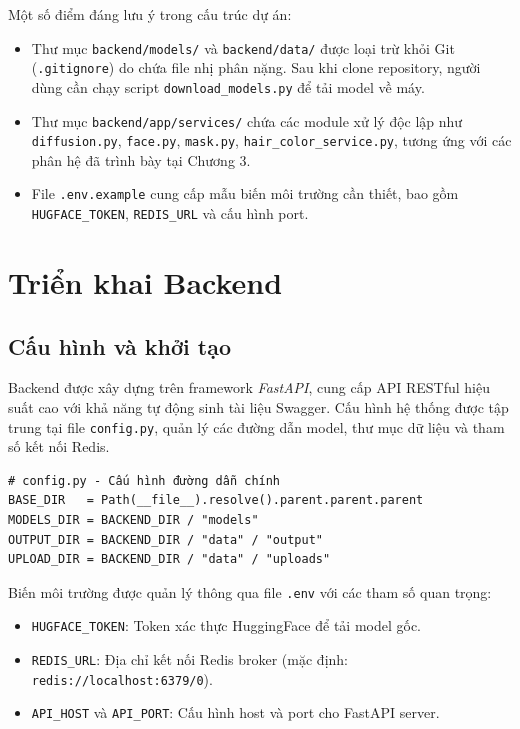 \documentclass[../main.tex]{subfiles}
\begin{document}
Một số điểm đáng lưu ý trong cấu trúc dự án:
\begin{itemize}
    \item Thư mục \texttt{backend/models/} và \texttt{backend/data/} được loại trừ khỏi Git (\texttt{.gitignore}) do chứa file nhị phân nặng. Sau khi clone repository, người dùng cần chạy script \texttt{download\_models.py} để tải model về máy.
    \item Thư mục \texttt{backend/app/services/} chứa các module xử lý độc lập như \texttt{diffusion.py}, \texttt{face.py}, \texttt{mask.py}, \texttt{hair\_color\_service.py}, tương ứng với các phân hệ đã trình bày tại Chương 3.
    \item File \texttt{.env.example} cung cấp mẫu biến môi trường cần thiết, bao gồm \texttt{HUGFACE\_TOKEN}, \texttt{REDIS\_URL} và cấu hình port.
\end{itemize}

\section{Triển khai Backend}

\subsection{Cấu hình và khởi tạo}
Backend được xây dựng trên framework \textit{FastAPI}, cung cấp API RESTful hiệu suất cao với khả năng tự động sinh tài liệu Swagger. Cấu hình hệ thống được tập trung tại file \texttt{config.py}, quản lý các đường dẫn model, thư mục dữ liệu và tham số kết nối Redis.

\begin{Verbatim}
# config.py - Cấu hình đường dẫn chính 
BASE_DIR   = Path(__file__).resolve().parent.parent.parent
MODELS_DIR = BACKEND_DIR / "models"
OUTPUT_DIR = BACKEND_DIR / "data" / "output"
UPLOAD_DIR = BACKEND_DIR / "data" / "uploads"
\end{Verbatim}

Biến môi trường được quản lý thông qua file \texttt{.env} với các tham số quan trọng:
\begin{itemize}
    \item \texttt{HUGFACE\_TOKEN}: Token xác thực HuggingFace để tải model gốc.
    \item \texttt{REDIS\_URL}: Địa chỉ kết nối Redis broker (mặc định: \texttt{redis://localhost:6379/0}).
    \item \texttt{API\_HOST} và \texttt{API\_PORT}: Cấu hình host và port cho FastAPI server.
\end{itemize}
\end{document}
